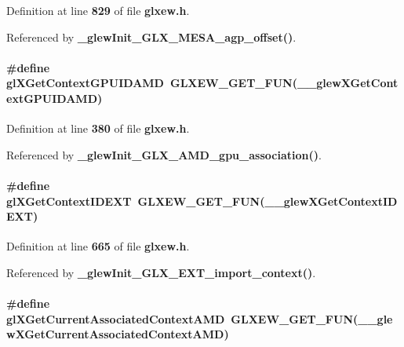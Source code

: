 Definition at line {\bf 829} of file {\bf glxew.\+h}.



Referenced by {\bf \+\_\+glew\+Init\+\_\+\+G\+L\+X\+\_\+\+M\+E\+S\+A\+\_\+agp\+\_\+offset()}.

\paragraph[{gl\+X\+Get\+Context\+G\+P\+U\+I\+D\+A\+MD}]{\setlength{\rightskip}{0pt plus 5cm}\#define gl\+X\+Get\+Context\+G\+P\+U\+I\+D\+A\+MD~{\bf G\+L\+X\+E\+W\+\_\+\+G\+E\+T\+\_\+\+F\+UN}({\bf \+\_\+\+\_\+glew\+X\+Get\+Context\+G\+P\+U\+I\+D\+A\+MD})}\label{glxew_8h_a4e2fb7dc30e36f2acfc9bd01b6b728ae}


Definition at line {\bf 380} of file {\bf glxew.\+h}.



Referenced by {\bf \+\_\+glew\+Init\+\_\+\+G\+L\+X\+\_\+\+A\+M\+D\+\_\+gpu\+\_\+association()}.

\paragraph[{gl\+X\+Get\+Context\+I\+D\+E\+XT}]{\setlength{\rightskip}{0pt plus 5cm}\#define gl\+X\+Get\+Context\+I\+D\+E\+XT~{\bf G\+L\+X\+E\+W\+\_\+\+G\+E\+T\+\_\+\+F\+UN}({\bf \+\_\+\+\_\+glew\+X\+Get\+Context\+I\+D\+E\+XT})}\label{glxew_8h_a4b403086230983ca93ac20f9999b7206}


Definition at line {\bf 665} of file {\bf glxew.\+h}.



Referenced by {\bf \+\_\+glew\+Init\+\_\+\+G\+L\+X\+\_\+\+E\+X\+T\+\_\+import\+\_\+context()}.

\paragraph[{gl\+X\+Get\+Current\+Associated\+Context\+A\+MD}]{\setlength{\rightskip}{0pt plus 5cm}\#define gl\+X\+Get\+Current\+Associated\+Context\+A\+MD~{\bf G\+L\+X\+E\+W\+\_\+\+G\+E\+T\+\_\+\+F\+UN}({\bf \+\_\+\+\_\+glew\+X\+Get\+Current\+Associated\+Context\+A\+MD})}\label{glxew_8h_a43a2f27c8075cef567b3455bc2f0ef25}


